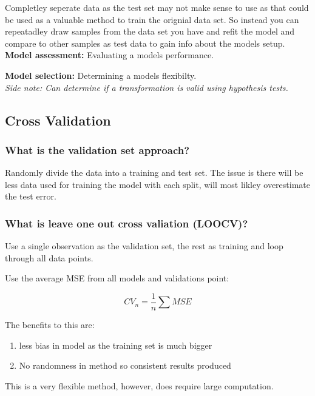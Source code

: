 \documentclass[11pt]{scrartcl} %
\begin{document}
Completley seperate data as the test set may not make sense to use as that could be used as
a valuable method to train the orignial data set. So instead you can repeatadley draw samples
from the data set you have and refit the model and compare to other samples as test data to gain
info about the models setup.\\

\textbf{Model assessment:} Evaluating a models performance.

\textbf{Model selection:} Determining a models flexibilty.\\

\textit{Side note: Can determine if a transformation is valid using hypothesis tests.}

\subsection{Cross Validation}

\subsubsection{What is the validation set approach?}

Randomly divide the data into a training and test set. The issue is there will be less data used
for training the model with each split, will most likley overestimate the test error.

\subsubsection{What is leave one out cross valiation (LOOCV)?}

Use a single observation as the validation set, the rest as training and loop through all data points.

Use the average MSE from all models and validations point:

\begin{equation}
	CV_n = \frac{1}{n} \sum MSE
\end{equation}

The benefits to this are:
\begin{enumerate}
	\item less bias in model as the training set is much bigger
	\item No randomness in method so consistent results produced
\end{enumerate}

This is a very flexible method, however, does require large computation.
\end{document}
